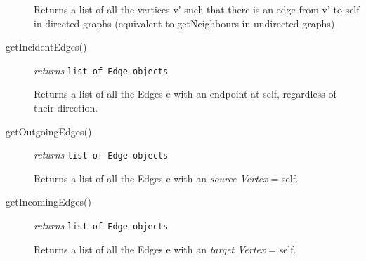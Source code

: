 \documentclass{article}
\newlength\q
\begin{document}
\begin{description}
Returns a list of all the vertices v' such that there is an edge from v' to self in directed graphs (equivalent to getNeighbours in undirected graphs)

\item[getIncidentEdges()]\emph{returns}
  \texttt{list of Edge objects}

Returns a list of all the Edges e with an endpoint at self, regardless of their direction.

\item[getOutgoingEdges()]\emph{returns}
  \texttt{list of Edge objects}

Returns a list of all the Edges e with an \textit{source Vertex} = self.

\item[getIncomingEdges()]\emph{returns}
  \texttt{list of Edge objects}

Returns a list of all the Edges e with an \textit{target Vertex} = self.

\end{description}
\end{document}

